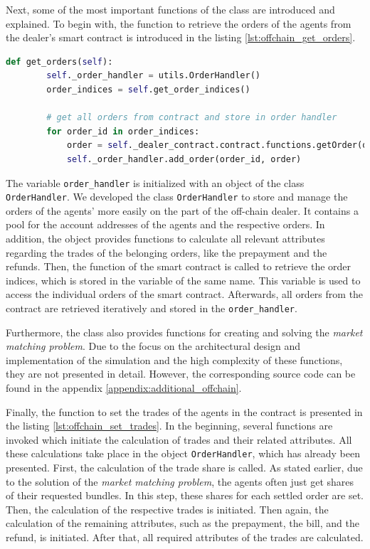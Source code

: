 Next, some of the most important functions of the class are introduced and explained.
To begin with, the function to retrieve the orders of the agents from the dealer's 
smart contract is introduced in the listing \ref{lst:offchain_get_orders}.

\begin{lstlisting}[float=htbp, label=lst:offchain_get_orders, caption=Retrievement of orders, language=Python]
    def get_orders(self):
        self._order_handler = utils.OrderHandler()
        order_indices = self.get_order_indices()

        # get all orders from contract and store in order handler
        for order_id in order_indices:
            order = self._dealer_contract.contract.functions.getOrder(order_id).call()
            self._order_handler.add_order(order_id, order)
\end{lstlisting}

The variable \verb|order_handler| is initialized with an object of the class \verb|OrderHandler|.
We developed the class \verb|OrderHandler| to store and manage the orders of the agents' more easily
on the part of the off-chain dealer.
It contains a pool for the account addresses of the agents and the 
respective orders. In addition, the object provides functions to 
calculate all relevant attributes regarding the trades of the belonging orders, 
like the prepayment and the refunds.
Then, the function of the smart contract is called to retrieve the order indices,
which is stored in the variable of the same name. This variable is used to 
access the individual orders of the smart contract.
Afterwards, all orders from the contract are retrieved iteratively and stored in the \verb|order_handler|.

Furthermore, the class also provides functions for creating and solving the \textit{market matching problem}.
Due to the focus on the architectural design and implementation of the simulation and the high complexity
of these functions, they are not presented in detail. However, the corresponding source code can be found in the appendix \ref{appendix:additional_offchain}.

Finally, the function to set the trades of the agents in the contract is presented in the listing \ref{lst:offchain_set_trades}.
In the beginning, several functions are invoked which initiate the calculation of trades and their related attributes.
All these calculations take place in the object \verb|OrderHandler|, which has already been presented.
First, the calculation of the trade share is called. As stated earlier, due to the solution of the 
\textit{market matching problem}, the agents often just get shares of their requested bundles. In this step,
these shares for each settled order are set. Then, the calculation of the respective trades is initiated.
Then again, the calculation of the remaining attributes, such as the prepayment, the bill, and the refund,
is initiated. 
After that, all required attributes of the trades are calculated.


